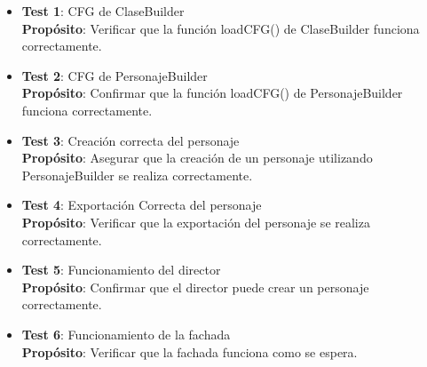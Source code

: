 \documentclass{article}
\begin{document}
\begin{itemize}
	\item \textbf{Test 1}: CFG de ClaseBuilder\\
\textbf{Propósito}: Verificar que la función loadCFG() de ClaseBuilder funciona correctamente.

	\item \textbf{Test 2}: CFG de PersonajeBuilder
\\ \textbf{Propósito}: Confirmar que la función loadCFG() de PersonajeBuilder funciona correctamente.


	\item \textbf{Test 3}: Creación correcta del personaje\\
\textbf{Propósito}: Asegurar que la creación de un personaje utilizando PersonajeBuilder se realiza correctamente.


	\item \textbf{Test 4}: Exportación Correcta del personaje
\\\textbf{Propósito}: Verificar que la exportación del personaje se realiza correctamente.


	\item \textbf{Test 5}: Funcionamiento del director
\\ \textbf{Propósito}: Confirmar que el director puede crear un personaje correctamente.


	\item \textbf{Test 6}: Funcionamiento de la fachada
\\ \textbf{Propósito}: Verificar que la fachada funciona como se espera.

\end{itemize}
\end{document}
